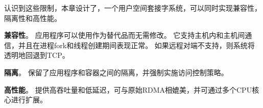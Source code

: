 



认识到这些限制，本章设计了\sys {}，一个用户空间套接字系统，可以同时实现兼容性，隔离性和高性能。
\begin{ecompact}
\item \textbf {兼容性}。
应用程序可以使用\sys {}作为替代品而无需修改。
它支持主机内和主机间通信，并且在进程fork和线程创建期间表现正常。
如果远程对端不支持\sys {}，则系统将透明地回退到TCP。
\item \textbf {隔离}。
\sys {}保留了应用程序和容器之间的隔离，并强制实施访问控制策略。
\item \textbf {高性能}。
\sys {}提供高吞吐量和低延迟，可与原始RDMA相媲美，并可通过多个CPU核心进行扩展。
\end{ecompact}


